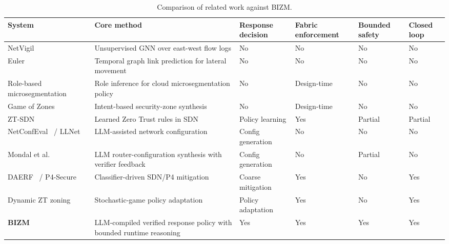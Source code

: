 \documentclass[final,5p]{elsarticle}
\begin{document}
\begin{table}[t]
    \centering
    \caption{Comparison of related work against BIZM.}
    \label{tab:positioning}
    \small
    \setlength{\tabcolsep}{4.5pt}
    \renewcommand{\arraystretch}{1.12}
    \begin{tabularx}{\textwidth}{@{}L{2.9cm}X C{1.65cm} C{1.45cm} C{1.45cm} C{1.2cm}@{}}
        \toprule
        \textbf{System} &
        \textbf{Core method} &
        \textbf{Response decision} &
        \textbf{Fabric enforcement} &
        \textbf{Bounded safety} &
        \textbf{Closed loop} \\
        \midrule
        NetVigil~\cite{netvigil} &
        Unsupervised GNN over east-west flow logs &
        No & No & No & No \\
        Euler~\cite{king2022euler} &
        Temporal graph link prediction for lateral movement &
        No & No & No & No \\
        Role-based microsegmentation~\cite{mani2025rolebased} &
        Role inference for cloud microsegmentation policy &
        No & Design-time & No & No \\
        Game of Zones~\cite{canavese2025gameofzones} &
        Intent-based security-zone synthesis &
        No & Design-time & No & No \\
        ZT-SDN~\cite{katsis2025ztsdn} &
        Learned Zero Trust rules in SDN &
        Policy learning & Yes & Partial & Partial \\
        NetConfEval~\cite{wang2024netconfeval} / LLNet~\cite{angi2025llnet} &
        LLM-assisted network configuration &
        Config generation & No & No & No \\
        Mondal et al.~\cite{mondal2023routerconfig} &
        LLM router-configuration synthesis with verifier feedback &
        Config generation & No & Partial & No \\
        DAERF~\cite{mhamdi2024daerf} / P4-Secure~\cite{manocchio2025p4secure} &
        Classifier-driven SDN/P4 mitigation &
        Coarse mitigation & Yes & No & Yes \\
        Dynamic ZT zoning~\cite{bello2025dynamic} &
        Stochastic-game policy adaptation &
        Policy adaptation & Yes & No & Yes \\
        \midrule
        \textbf{BIZM} &
        LLM-compiled verified response policy with bounded runtime reasoning &
        Yes & Yes & Yes & Yes \\
        \bottomrule
    \end{tabularx}
\end{table}
\end{document}
